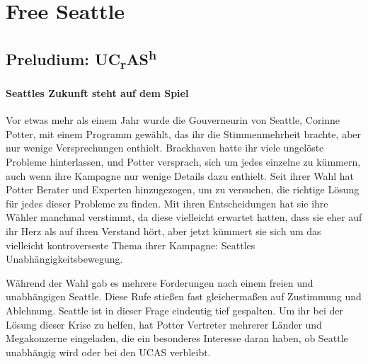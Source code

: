 \chapter{Free Seattle}

\section{Preludium: UC\texorpdfstring{\textsubscript{r}AS\textsuperscript{h}}{Preludium: UCrASh}}



\subsubsection{Seattles Zukunft steht auf dem Spiel}

Vor etwas mehr als einem Jahr wurde die Gouverneurin von Seattle, Corinne Potter, mit einem Programm gewählt, das ihr die Stimmenmehrheit brachte, aber nur wenige Versprechungen enthielt. Brackhaven hatte ihr viele ungelöste Probleme hinterlassen, und Potter versprach, sich um jedes einzelne zu kümmern, auch wenn ihre Kampagne nur wenige Details dazu enthielt. Seit ihrer Wahl hat Potter Berater und Experten hinzugezogen, um zu versuchen, die richtige Lösung für jedes dieser Probleme zu finden. Mit ihren Entscheidungen hat sie ihre Wähler manchmal verstimmt, da diese vielleicht erwartet hatten, dass sie eher auf ihr Herz als auf ihren Verstand hört, aber jetzt kümmert sie sich um das vielleicht kontroverseste Thema ihrer Kampagne: Seattles Unabhängigkeitsbewegung. 

Während der Wahl gab es mehrere Forderungen nach einem freien und unabhängigen Seattle. Diese Rufe stießen fast gleichermaßen auf Zustimmung und Ablehnung. Seattle ist in dieser Frage eindeutig tief gespalten. Um ihr bei der Lösung dieser Krise zu helfen, hat Potter Vertreter mehrerer Länder und Megakonzerne eingeladen, die ein besonderes Interesse daran haben, ob Seattle unabhängig wird oder bei den UCAS verbleibt.

